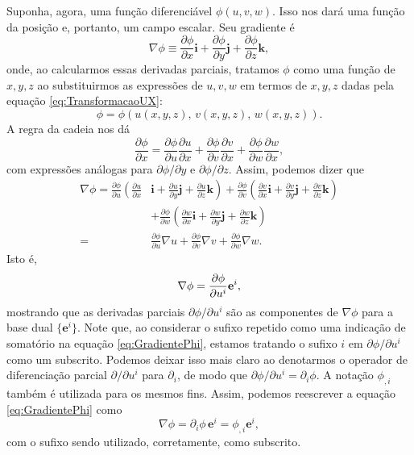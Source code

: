 Suponha, agora, uma função diferenciável $\phi(u,v,w)$. Isso nos dará uma função da posição e, portanto, um campo escalar. Seu gradiente é
\[
	\nabla \phi \equiv \frac{\partial \phi}{\partial x} \mathbf{i}+\frac{\partial \phi}{\partial y} \mathbf{j}+\frac{\partial \phi}{\partial z} \mathbf{k} ,
\]
onde, ao calcularmos essas derivadas parciais, tratamos $\phi$ como uma função de $x,y,z$ ao substituirmos as expressões de $u,v,w$ em termos de $x,y,z$ dadas pela equação \eqref{eq:TransformacaoUX}:
\[
	\phi = \phi(u(x,y,z),\,v(x,y,z),\,w(x,y,z)) .
\]
A regra da cadeia nos dá 
\[
	\frac{\partial \phi}{\partial x}=\frac{\partial \phi}{\partial u} \frac{\partial u}{\partial x}+\frac{\partial \phi}{\partial v} \frac{\partial v}{\partial x}+\frac{\partial \phi}{\partial w} \frac{\partial w}{\partial x}	
,\]
com expressões análogas para $\partial\phi/\partial y$ e $\partial\phi/\partial z$. Assim, podemos dizer que
\begin{align*} \nabla \phi=\frac{\partial \phi}{\partial u}\left(\frac{\partial u}{\partial x}\right.&\left.\mathbf{i}+\frac{\partial u}{\partial y} \mathbf{j}+\frac{\partial u}{\partial z} \mathbf{k}\right)+\frac{\partial \phi}{\partial v}\left(\frac{\partial v}{\partial x} \mathbf{i}+\frac{\partial v}{\partial y} \mathbf{j}+\frac{\partial v}{\partial z} \mathbf{k}\right) \\ &+\frac{\partial \phi}{\partial w}\left(\frac{\partial w}{\partial x} \mathbf{i}+\frac{\partial w}{\partial y} \mathbf{j}+\frac{\partial w}{\partial z} \mathbf{k}\right) \\=& \frac{\partial \phi}{\partial u} \nabla u+\frac{\partial \phi}{\partial v} \nabla v+\frac{\partial \phi}{\partial w} \nabla w .
\end{align*}
Isto é,
\begin{equation}\label{eq:GradientePhi}
	\nabla\phi = \pdv{\phi}{u^i}\mathbf{e}^i,
\end{equation}
mostrando que as derivadas parciais $\partial\phi/\partial u^i$ são as componentes de $\nabla\phi$ para a base dual $\{\mathbf{e}^i\}$. Note que, ao considerar o sufixo repetido como uma indicação de somatório na equação \eqref{eq:GradientePhi}, estamos tratando o sufixo $i$ em $\partial\phi/\partial u^i$ como um subscrito. Podemos deixar isso mais claro ao denotarmos o operador de diferenciação parcial $\partial/\partial u^i$ para $\partial_i$, de modo que $\partial\phi/\partial u^i=\partial_i\phi$. A notação $\phi_{,i}$ também é utilizada para os mesmos fins. Assim, podemos reescrever a equação \eqref{eq:GradientePhi} como 
\begin{equation}\label{eq:GradientePhiNotacao}
	\nabla\phi=\partial_i \phi \,\mathbf{e}^i = \phi_{,i}\mathbf{e}^i,
\end{equation}
com o sufixo sendo utilizado, corretamente, como subscrito. 

